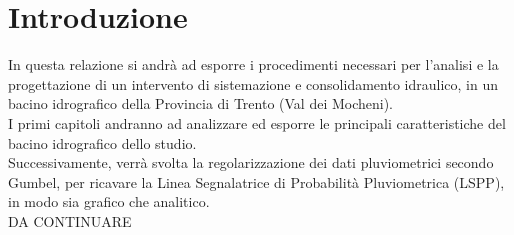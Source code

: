 \section{Introduzione}
In questa relazione si andrà ad esporre i procedimenti necessari per l'analisi e la progettazione di un intervento di sistemazione e consolidamento idraulico, in un bacino idrografico della Provincia di Trento (Val dei Mocheni).\\
I primi capitoli andranno ad analizzare ed esporre le principali caratteristiche del bacino idrografico dello studio.\\
Successivamente, verrà svolta la regolarizzazione dei dati pluviometrici secondo Gumbel, per ricavare la Linea Segnalatrice di Probabilità Pluviometrica (LSPP), in modo sia grafico che analitico.\\ 
DA CONTINUARE 